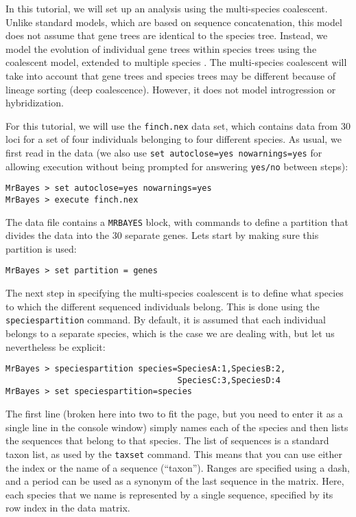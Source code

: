 \documentclass[12pt]{book}
\begin{document}
In this tutorial, we will set up an analysis using the multi-species coalescent. Unlike standard
models, which are based on sequence concatenation, this model does not assume that gene trees are
identical to the species tree. Instead, we model the evolution of individual gene trees within
species trees using the coalescent model, extended to multiple species \citep{liu07,edwards07}. The
multi-species coalescent will take into account that gene trees and species trees may be different
because of lineage sorting (deep coalescence). However, it does not model introgression or
hybridization.

For this tutorial, we will use the \texttt{finch.nex} data set, which contains data from 30 loci
for a set of four individuals belonging to four different species. As usual, we first read in the
data (we also use \texttt{set autoclose=yes nowarnings=yes} for allowing execution without being
prompted for answering \texttt{yes/no} between steps):

\begin{Verbatim}
MrBayes > set autoclose=yes nowarnings=yes
MrBayes > execute finch.nex
\end{Verbatim}

The data file contains a \texttt{MRBAYES} block, with commands to define a partition that divides
the data into the 30 separate genes. Lets start by making sure this partition is used:

\begin{Verbatim}
MrBayes > set partition = genes
\end{Verbatim}

The next step in specifying the multi-species coalescent is to define what species to which the
different sequenced individuals belong. This is done using the \texttt{speciespartition} command.
By default, it is assumed that each individual belongs to a separate species, which is the case we
are dealing with, but let us nevertheless be explicit:

\begin{Verbatim}
MrBayes > speciespartition species=SpeciesA:1,SpeciesB:2,
                                   SpeciesC:3,SpeciesD:4
MrBayes > set speciespartition=species
\end{Verbatim}

The first line (broken here into two to fit the page, but you need to enter it as a single line in
the console window) simply names each of the species and then lists the sequences that belong to
that species. The list of sequences is a standard taxon list, as used by the \texttt{taxset}
command.  This means that you can use either the index or the name of a sequence (``taxon'').
Ranges are specified using a dash, and a period can be used as a synonym of the last sequence in
the matrix.  Here, each species that we name is represented by a single sequence, specified by its
row index in the data matrix.
\end{document}
